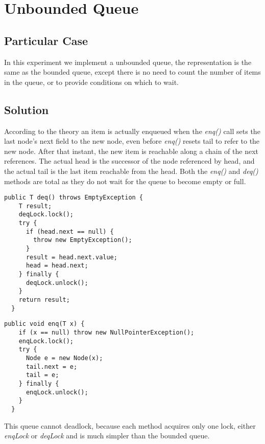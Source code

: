 


\section{\textbf{Unbounded Queue}}



\subsection{Particular Case}
\par
In this experiment we implement a unbounded queue, the representation is the same as the bounded queue, except there is no need to count the number of items in the queue, or to provide conditions on which to wait.
\par



\subsection{Solution}
\par
According to the theory an item is actually enqueued when the \textit{enq()} call sets the last node’s next field to the new node, even before \textit{enq()} resets tail to refer to the new node. After that instant, the new item is reachable along a chain of the next references. 
The actual head is the successor of the node referenced by head, and the actual tail is the last item reachable from the head. Both the \textit{enq()} and \textit{deq()} methods are total as they do not wait for the queue to become empty or full.
\par
\begin{lstlisting}[frame=single,breaklines=true]
  public T deq() throws EmptyException {
    T result;
    deqLock.lock();
    try {
      if (head.next == null) {
        throw new EmptyException();
      }
      result = head.next.value;
      head = head.next;
    } finally {
      deqLock.unlock();
    }
    return result;
  }
\end{lstlisting}
\par
\begin{lstlisting}[frame=single,breaklines=true]
  public void enq(T x) {
    if (x == null) throw new NullPointerException();
    enqLock.lock();
    try {
      Node e = new Node(x);
      tail.next = e;
      tail = e;
    } finally {
      enqLock.unlock();
    }
  }
\end{lstlisting}
\par
This queue cannot deadlock, because each method acquires only one lock, either \textit{enqLock} or \textit{deqLock} and is much simpler than the bounded queue.

